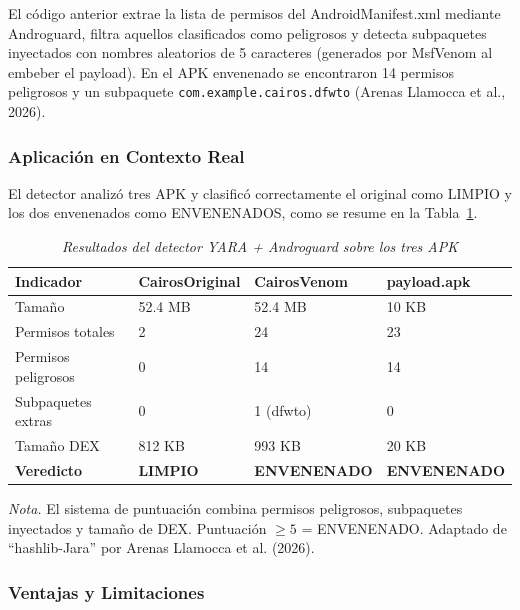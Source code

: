 \documentclass[12pt,a4paper]{article}
\begin{document}
El código anterior extrae la lista de permisos del AndroidManifest.xml
mediante Androguard, filtra aquellos clasificados como peligrosos y
detecta subpaquetes inyectados con nombres aleatorios de 5 caracteres
(generados por MsfVenom al embeber el payload). En el APK envenenado se
encontraron 14 permisos peligrosos y un subpaquete
\texttt{com.example.cairos.dfwto} (Arenas Llamocca et al., 2026).

\subsubsection{Aplicación en Contexto Real}

El detector analizó tres APK y clasificó correctamente el original como
LIMPIO y los dos envenenados como ENVENENADOS, como se resume en la
Tabla~\ref{tab:resultados_deteccion}.

\begin{table}[H]
\centering\footnotesize
\begin{threeparttable}
\caption{\textit{Resultados del detector YARA + Androguard sobre los tres APK}}
\label{tab:resultados_deteccion}
\begin{tabular}{p{3.3cm}p{3.2cm}p{3.2cm}p{2.8cm}}
\toprule
\textbf{Indicador} & \textbf{CairosOriginal} & \textbf{CairosVenom} & \textbf{payload.apk} \\
\midrule
Tamaño & 52.4 MB & 52.4 MB & 10 KB \\
Permisos totales & 2 & 24 & 23 \\
Permisos peligrosos & 0 & 14 & 14 \\
Subpaquetes extras & 0 & 1 (dfwto) & 0 \\
Tamaño DEX & 812 KB & 993 KB & 20 KB \\
\textbf{Veredicto} & \textbf{LIMPIO} & \textbf{ENVENENADO} & \textbf{ENVENENADO} \\
\bottomrule
\end{tabular}
\begin{tablenotes}
\item \textit{Nota.} El sistema de puntuación combina permisos peligrosos, subpaquetes inyectados y tamaño de DEX. Puntuación $\geq 5$ = ENVENENADO. Adaptado de \enquote{hashlib-Jara} por Arenas Llamocca et al. (2026).
\end{tablenotes}
\end{threeparttable}
\end{table}

\subsubsection{Ventajas y Limitaciones}
\end{document}
